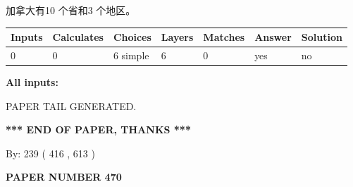 \documentclass{ctexart}
\begin{document}
 
加拿大有10 个省和3 个地区。
 
 
\noindent{}
 
 
   
   
   
   
\noindent\begin{tabular}{|l|l|l|l|l|l|l|}
 \hline
Inputs & Calculates & Choices & Layers & Matches & Answer & Solution \\ \hline
 0  & 
 0  & 
 6
  simple  
  & 
 6  & 
 0  & 
  yes & 
  no 
  \\ \hline
 \end{tabular}
   
   
   
   
\noindent{}
   
   
   
   
\noindent\vspace{0.1in}\hspace{-0.08in} {\textbf{\Large{All inputs: }}}
   
   
   
   
   
   
 \vspace{0.2in}
 
   
   
\vspace{2.0in} PAPER TAIL GENERATED.
   
   
   
   
\vspace{1.0in} 
{\textbf{\large{ *** END OF PAPER, THANKS *** }}} 
   
   
\hspace{1.0in} By: 
 239 ( 416 ,  613 )
   
   
   
   
\newpage 
\setcounter{page}{ 
   470001 } 
   
   
   
   
 {\textbf{ \Large{ PAPER NUMBER  470  }}}
   
   
\vspace{0.2in}
   
   
   
   
   
   
   
\end{document}
